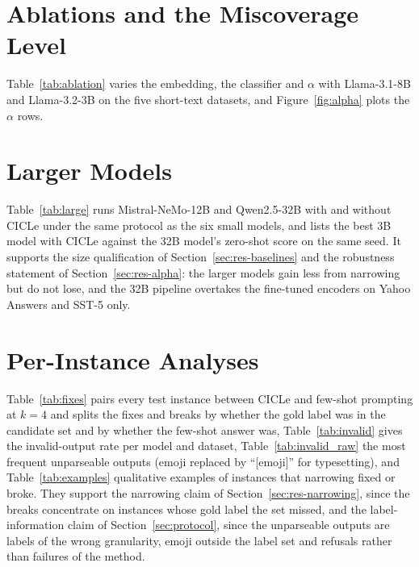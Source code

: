 



\section{Ablations and the Miscoverage Level}
\label{app:ablations}

Table~\ref{tab:ablation} varies the embedding, the classifier and $\alpha$ with Llama-3.1-8B and Llama-3.2-3B on the five short-text datasets, and Figure~\ref{fig:alpha} plots the $\alpha$ rows. %




\section{Larger Models}
\label{app:large}

Table~\ref{tab:large} runs Mistral-NeMo-12B and Qwen2.5-32B with and without CICLe under the same protocol as the six small models, and lists the best 3B model with CICLe against the 32B model's zero-shot score on the same seed. It supports the size qualification of Section~\ref{sec:res-baselines} and the robustness statement of Section~\ref{sec:res-alpha}: the larger models gain less from narrowing but do not lose, and the 32B pipeline overtakes the fine-tuned encoders on Yahoo Answers and SST-5 only.



\section{Per-Instance Analyses}
\label{app:instances}

Table~\ref{tab:fixes} pairs every test instance between CICLe and few-shot prompting at $k = 4$ and splits the fixes and breaks by whether the gold label was in the candidate set and by whether the few-shot answer was, Table~\ref{tab:invalid} gives the invalid-output rate per model and dataset, Table~\ref{tab:invalid_raw} the most frequent unparseable outputs (emoji replaced by ``[emoji]'' for typesetting), and Table~\ref{tab:examples} qualitative examples of instances that narrowing fixed or broke. They support the narrowing claim of Section~\ref{sec:res-narrowing}, since the breaks concentrate on instances whose gold label the set missed, and the label-information claim of Section~\ref{sec:protocol}, since the unparseable outputs are labels of the wrong granularity, emoji outside the label set and refusals rather than failures of the method.

